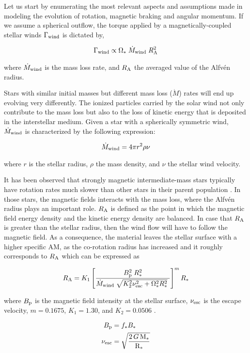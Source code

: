 \documentclass[fleqn,usenatbib]{mnras}
\begin{document}
Let us start by enumerating the most relevant aspects and assumptions made in modeling the evolution of rotation, magnetic braking and angular momentum. If we assume a spherical outflow, the torque applied by a magnetically-coupled stellar winds $\Gamma_{\mathrm{wind}}$ is dictated by,
\begin{ceqn}
\begin{equation}
    \Gamma_{\mathrm{wind}} \propto \Omega_* \; \Dot{M}_{\mathrm{wind}} \; R_{\mathrm{A}}^{2} \label{eq:mb_torque}
\end{equation}
\end{ceqn}
where $\Dot{M}_{\mathrm{wind}}$ is the mass loss rate, and $R_{\mathrm{A}}$ the averaged value of the Alfvén radius.\par
Stars with similar initial masses but different mass loss ($\Dot{M}$) rates will end up evolving very differently. The ionized particles carried by the solar wind not only contribute to the mass loss but also to the loss of kinetic energy that is deposited in the interstellar medium. Given a star with a spherically symmetric wind, $\Dot{M}_{\mathrm{wind}}$ is characterized by the following expression:

\begin{ceqn}
\begin{equation}
    \Dot{M}_{\mathrm{wind}} = 4\pi r^2\rho\nu \label{eq:mass_loss}
\end{equation}
\end{ceqn}
where $r$ is the stellar radius, $\rho$ the mass density, and $\nu$ the stellar wind velocity.

It has been observed that strongly magnetic intermediate-mass stars typically have rotation rates much slower than other stars in their parent population \citep{Mathys2006}. In those stars, the magnetic fields interacts with the mass loss, where the Alfv\'{e}n radius plays an important role. $R_{\mathrm{A}}$ is defined as the point in which the magnetic field energy density and the kinetic energy density are balanced. In case that $R_{\mathrm{A}}$ is greater than the stellar radius, then the wind flow will have to follow the magnetic field. As a consequence, the material leaves the stellar surface with a higher specific AM, as the co-rotation radius has increased and it roughly corresponds to $R_{\mathrm{A}}$ which can be expressed as \citep{Matt2012}
\begin{ceqn}
\begin{equation}
    R_{\mathrm{A}} = K_1\left[\frac{B_{\mathrm{p}}^{2}\;R_*^{2}}{\Dot{M}_{\mathrm{wind}}\;\sqrt{K_2^2\nu_{\mathrm{esc}}^2 + \Omega_*^2R_*^{2}}\ }\right]^{m}R_*  \label{eq:mb_ralfven}
\end{equation}
\end{ceqn}
where $B_{\mathrm{p}}$ is the magnetic field intensity at the stellar surface, $\nu_{\mathrm{esc}}$ is the escape velocity, $m = 0.1675$, $K_1 = 1.30$, and $K_2 = 0.0506$ \citep{Gallet2013}.
\begin{ceqn}
\begin{align}
B_{\mathrm{p}} &= f_*B_* \label{eq:bp}\\
\nu_{\mathrm{esc}} &= \sqrt{\frac{2\,G\,\mathrm{M}_*}{\mathrm{R}_*}} \label{eq:vesc}
\end{align}
\end{ceqn}
\end{document}
